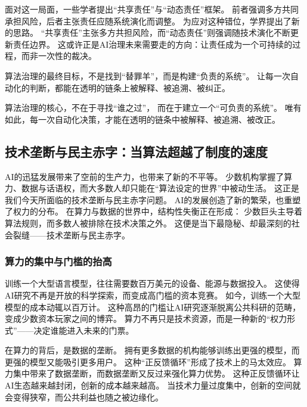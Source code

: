 面对这一局面，一些学者提出“共享责任”与“动态责任”框架。  
前者强调多方共同承担风险，后者主张责任应随系统演化而调整。  
为应对这种错位，学界提出了新的思路。  
“共享责任”主张多方共担风险，而“动态责任”则强调随技术演化不断更新责任边界。  
这或许正是AI治理未来需要走的方向：让责任成为一个可持续的过程，而非一次性的裁决。

\begin{center}
算法治理的最终目标，不是找到“替罪羊”，而是构建“负责的系统”。  
让每一次自动化的判断，都能在透明的链条上被解释、被追溯、被纠正。  
\end{center}
\begin{center}
算法治理的核心，不在于寻找“谁之过”，  
而在于建立一个“可负责的系统”。  
唯有如此，每一次自动化决策，才能在透明的链条中被解释、被追溯、被改正。  
\end{center}


\subsection{技术垄断与民主赤字：当算法超越了制度的速度}

AI的迅猛发展带来了空前的生产力，也带来了新的不平等。  
少数机构掌握了算力、数据与话语权，而大多数人却只能在“算法设定的世界”中被动生活。  
这正是我们今天所面临的技术垄断与民主赤字问题。  
AI的发展创造了新的繁荣，也重塑了权力的分布。  
在算力与数据的世界中，结构性失衡正在形成：  
少数巨头主导着算法规则，而多数人被排除在技术决策之外。  
这便是当下最隐秘、却最深刻的社会裂缝——技术垄断与民主赤字。

\subsubsection{算力的集中与门槛的抬高}

训练一个大型语言模型，往往需要数百万美元的设备、能源与数据投入。  
这使得AI研究不再是开放的科学探索，而变成高门槛的资本竞赛。  
如今，训练一个大型模型的成本动辄以百万计。  
这种高昂的门槛让AI研究逐渐脱离公共科研的范畴，变成少数资本玩家之间的博弈。  
算力不再只是技术资源，而是一种新的“权力形式”——决定谁能进入未来的门票。

在算力的背后，是数据的垄断。  
拥有更多数据的机构能够训练出更强的模型，而更强的模型又能吸引更多用户。  
这种“正反馈循环”形成了技术上的马太效应。  
算力集中带来了数据垄断，而数据垄断又反过来强化算力优势。  
这种正反馈循环让AI生态越来越封闭，创新的成本越来越高。  
当技术力量过度集中，创新的空间就会变得狭窄，而公共利益也随之被边缘化。

